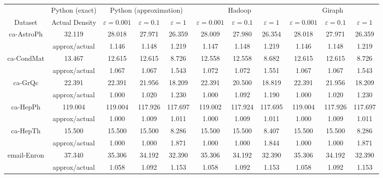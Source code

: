 \documentclass{article}
\begin{document}
\begin{landscape}
\begin{tabular}{|c|c|ccc|ccc|ccc|}
\hline
                               & Python (exact) & \multicolumn{3}{|c|}{ Python (approximation) } & \multicolumn{3}{|c|}{ Hadoop } & \multicolumn{3}{|c|}{ Giraph }   \\
Dataset                        & Actual Density & $\varepsilon=0.001$ & $\varepsilon=0.1$ & $\varepsilon=1$ & $\varepsilon=0.001$ & $\varepsilon=0.1$ & $\varepsilon=1$ & $\varepsilon=0.001$ & $\varepsilon=0.1$ & $\varepsilon=1$ \\
\hline
\multirow{2}{*}{ ca-AstroPh }  & 32.119         & 28.018  & 27.971  & 26.359                   & 28.009  & 27.980  & 26.354   & 28.018  & 27.971  & 26.359     \\
                               & approx/actual  & 1.146   & 1.148   & 1.219                    & 1.147   & 1.148   & 1.219    & 1.146   & 1.148   & 1.219      \\
\hline
\multirow{2}{*}{ ca-CondMat }  & 13.467         & 12.615  & 12.615  & 8.726                    & 12.558  & 12.558  & 8.682    & 12.615  & 12.615  & 8.726      \\
                               & approx/actual  & 1.067   & 1.067   & 1.543                    & 1.072   & 1.072   & 1.551    & 1.067   & 1.067   & 1.543      \\
\hline
\multirow{2}{*}{ ca-GrQc }     & 22.391         & 22.391  & 21.956  & 18.209                   & 22.391  & 20.500  & 18.819   & 22.391  & 21.956  & 18.209     \\
                               & approx/actual  & 1.000   & 1.020   & 1.230                    & 1.000   & 1.092   & 1.190    & 1.000   & 1.020   & 1.230      \\
\hline
\multirow{2}{*}{ ca-HepPh }    & 119.004        & 119.004 & 117.926 & 117.697                  & 119.002 & 117.924 & 117.695  & 119.004 & 117.926 & 117.697    \\
                               & approx/actual  & 1.000   & 1.009   & 1.011                    & 1.000   & 1.009   & 1.011    & 1.000   & 1.009   & 1.011      \\
\hline
\multirow{2}{*}{ ca-HepTh }    & 15.500         & 15.500  & 15.500  & 8.286                    & 15.500  & 15.500  & 8.407    & 15.500  & 15.500  & 8.286      \\
                               & approx/actual  & 1.000   & 1.000   & 1.871                    & 1.000   & 1.000   & 1.844    & 1.000   & 1.000   & 1.871      \\
\hline
\multirow{2}{*}{ email-Enron } & 37.340         & 35.306  & 34.192  & 32.390                   & 35.306  & 34.192  & 32.390   & 35.306  & 34.192  & 32.390     \\
                               & approx/actual  & 1.058   & 1.092   & 1.153                    & 1.058   & 1.092   & 1.153    & 1.058   & 1.092   & 1.153      \\
\hline
\end{tabular}


\end{landscape}
\end{document}
